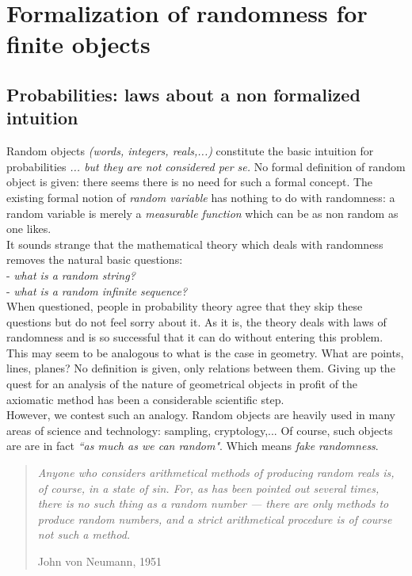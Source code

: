 \section{Formalization of randomness for finite objects}
\subsection{Probabilities: laws about a non formalized intuition}
Random objects {\em(words, integers, reals,...)}
constitute the basic intuition for probabilities
{\em... but they are not considered per se.}
No formal definition of random object is given:
there seems there is no need for such a formal concept.
The existing formal notion of {\em random variable} has nothing
to do with randomness: a random variable is merely a
{\em measurable function} which can be as non random as one likes.
\medskip\\
It sounds strange that the mathematical theory which deals with
randomness removes the natural basic questions:
\\\indent- {\em what is a random string?}
\\\indent- {\em what is a random infinite sequence?}
\\
When questioned, people in probability theory agree that they
skip these questions but do not feel sorry about it.
As it is, the theory deals with laws of randomness and
is so successful that it can do without entering this problem.
\medskip\\
This may seem to be analogous to what is the case in geometry.
What are points, lines, planes?
No definition is given, only relations between them.
Giving up the quest for an analysis of the nature of geometrical
objects  in profit of the axiomatic method
has been a considerable scientific step.
\\
However, we contest such an analogy.
Random objects are heavily used in many areas of science
and technology: sampling, cryptology,...
Of course, such objects are are in fact
{\em ``as much as we can random"}.
Which means {\em fake randomness}.
\begin{quote}{\em
Anyone who considers arithmetical methods of producing random reals
is, of course, in a state of sin.
For, as has been pointed out several times, there is no such thing
as a random number --- there are only methods to produce random
numbers, and a strict arithmetical procedure is of course not such
a method.}

\hfill{ John von Neumann, 1951 \cite{neumannsin}}
\end{quote}
